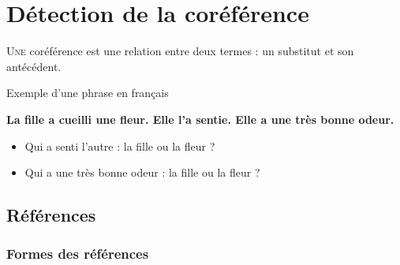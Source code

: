 \documentclass{KodeBook}
\begin{document}
		\mainmatter
	
\fi
\chapter{Détection de la coréférence}

\begin{introduction}
	\lettrine{U}{ne} coréférence est une relation entre deux termes : un substitut et son antécédent.
\end{introduction} 

\begin{exampleblock}{Exemple d'une phrase en français}
	\begin{center}
		\Large\bfseries
		La fille a cueilli une fleur. Elle l'a sentie. Elle a une très bonne odeur.
	\end{center}
\end{exampleblock}

\begin{itemize}
	\item Qui a senti l'autre : la fille ou la fleur ?
	\item Qui a une très bonne odeur : la fille ou la fleur ?
\end{itemize}

\section{Références}

\subsection{Formes des références}
\end{document}
